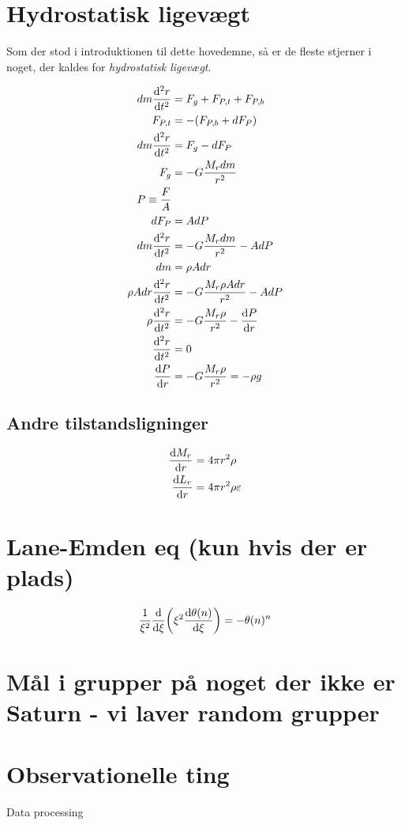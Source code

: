 \documentclass[crop=false, class=memoir]{standalone}
\begin{document}
\section{Hydrostatisk ligevægt}

Som der stod i introduktionen til dette hovedemne, så er de fleste stjerner i noget, der kaldes for \emph{hydrostatisk ligevægt}. 

\begin{align}
    dm \dv[2]{r}{t} &= F_g + F_{P,t} + F_{P,b}\\
    F_{P,t} &= -(F_{P,b} + dF_P)\\
    dm \dv[2]{r}{t} &= F_g - dF_P\\
    F_g &= -G \frac{M_rdm}{r^2}\\
    P \equiv \frac{F}{A}\\
    dF_P &= A dP\\
    dm \dv[2]{r}{t} &= -G \frac{M_r dm}{r^2} - A dP\\
    dm &= \rho A dr\\
    \rho A dr \dv[2]{r}{t} &= -G \frac{M_r \rho A dr}{r^2} - A dP\\
    \rho \dv[2]{r}{t} &= -G \frac{M_r \rho}{r^2} - \dv{P}{r}\\
    \dv[2]{r}{t} &= 0\\
    \dv{P}{r} &= -G\frac{M_r\rho}{r^2} = -\rho g
\end{align}

\subsection{Andre tilstandsligninger}

\begin{align}
    \dv{M_r}{r} &= 4\pi r^2 \rho\\
    \dv{L_r}{r} &= 4\pi r^2 \rho \varepsilon
\end{align}

\section{Lane-Emden eq (kun hvis der er plads)}

\begin{equation}
    \frac{1}{\xi^2} \dv{\xi}(\xi^2\dv{\theta(n)}{\xi}) = -\theta(n)^n
\end{equation}

\section{Mål i grupper på noget der ikke er Saturn - vi laver random grupper}

\section{Observationelle ting}
Data processing
\end{document}

